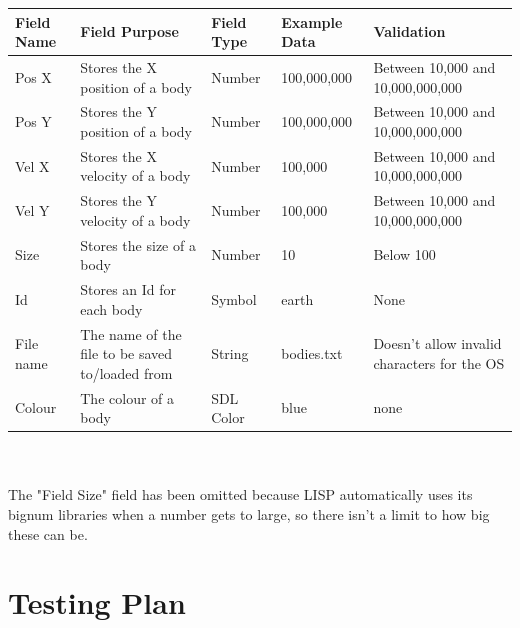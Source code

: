 \begin{tabular}{p{}p{}p{}
			p{}p{}}
	Field Name & Field Purpose & Field Type & Example Data &
	Validation \\ \hline
	Pos X & Stores the X position of a body & Number & 100,000,000 & Between
	10,000 and 10,000,000,000 \\
	Pos Y & Stores the Y position of a body & Number & 100,000,000 & Between
	10,000 and 10,000,000,000 \\
	Vel X & Stores the X velocity of a body & Number & 100,000 & Between
	10,000 and 10,000,000,000 \\
	Vel Y & Stores the Y velocity of a body & Number & 100,000 & Between
	10,000 and 10,000,000,000 \\
	Size & Stores the size of a body & Number & 10 & Below 100 \\
	Id & Stores an Id for each body & Symbol & earth & None \\
	File name & The name of the file to be saved to/loaded from & String &
	bodies.txt & Doesn't allow invalid characters for the OS \\
	Colour & The colour of a body & SDL Color & blue & none \\
\end{tabular} \\ \\ 

The "Field Size" field has been omitted because LISP automatically uses its
bignum libraries when a number gets to large, so there isn't a limit to how big
these can be.

\section{Testing Plan}

